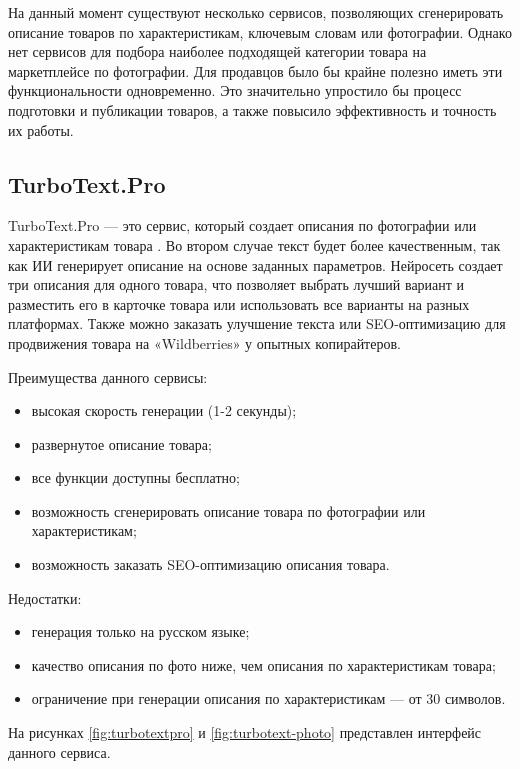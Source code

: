 \documentclass[a4paper,12pt]{extarticle}
\begin{document}
На данный момент существуют несколько сервисов, позволяющих сгенерировать описание товаров по характеристикам, ключевым словам или фотографии. Однако нет сервисов для подбора наиболее подходящей категории товара на маркетплейсе по фотографии. Для продавцов было бы крайне полезно иметь эти функциональности одновременно. Это значительно упростило бы процесс подготовки и публикации товаров, а также повысило эффективность и точность их работы.

\subsection{TurboText.Pro}

TurboText.Pro — это сервис, который создает описания по фотографии или характеристикам товара \cite{turbotextpro}. Во втором случае текст будет более качественным, так как ИИ генерирует описание на основе заданных параметров. Нейросеть создает три описания для одного товара, что позволяет выбрать лучший вариант и разместить его в карточке товара или использовать все варианты на разных платформах. Также можно заказать улучшение текста или SEO-оптимизацию для продвижения товара на «Wildberries» у опытных копирайтеров.

Преимущества данного сервисы:
\begin{itemize}
	\item высокая скорость генерации (1-2 секунды);
	\item развернутое описание товара;
	\item все функции доступны бесплатно;
	\item возможность сгенерировать описание товара по фотографии или характеристикам;
	\item возможность заказать SEO-оптимизацию описания товара.
\end{itemize}

Недостатки:
\begin{itemize}
	\item генерация только на русском языке;
	\item качество описания по фото ниже, чем описания по характеристикам товара;
	\item ограничение при генерации описания по характеристикам — от 30 символов.
\end{itemize}

На рисунках \ref{fig:turbotextpro} и \ref{fig:turbotext-photo} представлен интерфейс данного сервиса.
\end{document}
